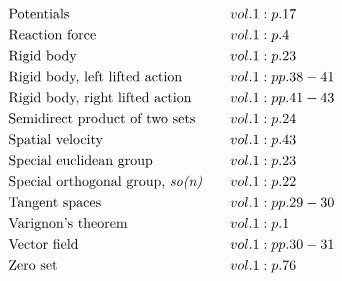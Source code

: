\documentclass[a4paper]{article}
\begin{document}
\begin{align*}
&\text{Potentials} \hspace*{1em}&& vol. 1: p. 17\\
&\text{Reaction force} \hspace*{1em}&& vol. 1: p. 4\\
&\text{Rigid body} \hspace*{1em}&& vol. 1: p. 23\\
&\text{Rigid body, left lifted action} \hspace*{1em}&& vol. 1: pp. 38-41\\
&\text{Rigid body, right lifted action} \hspace*{1em}&& vol. 1: pp. 41-43\\
&\text{Semidirect product of two sets} \hspace*{1em}&& vol. 1: p. 24\\
&\text{Spatial velocity} \hspace*{1em}&& vol. 1: p. 43\\
&\text{Special euclidean group} \hspace*{1em}&& vol. 1: p. 23\\
&\text{Special orthogonal group, \emph{so(n)}} \hspace*{1em}&& vol. 1: p. 22\\
&\text{Tangent spaces} \hspace*{1em}&& vol. 1: pp. 29-30\\
&\text{Varignon's theorem} \hspace*{1em}&& vol. 1: p. 1\\
&\text{Vector field} \hspace*{1em}&& vol. 1: pp. 30-31\\
&\text{Zero set} \hspace*{1em}&& vol. 1: p. 76\\
\end{align*} 
\end{document}
